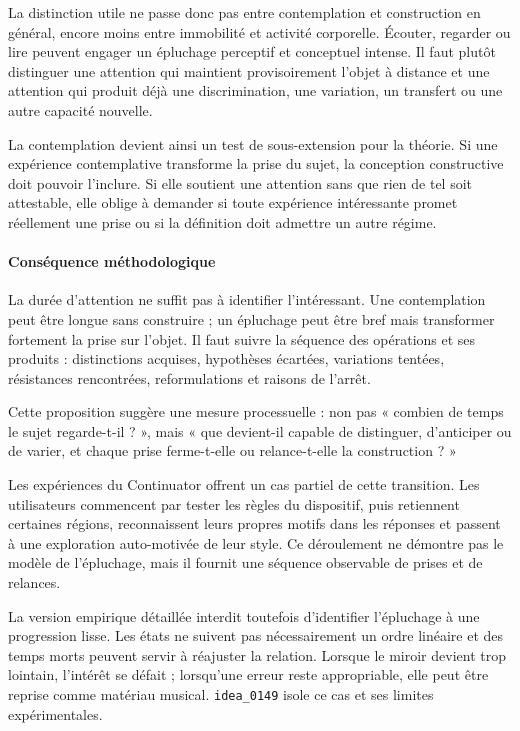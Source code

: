 \documentclass[10pt,a4paper]{article}
\begin{document}
La distinction utile ne passe donc pas entre contemplation et construction en général, encore moins entre immobilité et activité corporelle. Écouter, regarder ou lire peuvent engager un épluchage perceptif et conceptuel intense. Il faut plutôt distinguer une attention qui maintient provisoirement l'objet à distance et une attention qui produit déjà une discrimination, une variation, un transfert ou une autre capacité nouvelle.

La contemplation devient ainsi un test de sous-extension pour la théorie. Si une expérience contemplative transforme la prise du sujet, la conception constructive doit pouvoir l'inclure. Si elle soutient une attention sans que rien de tel soit attestable, elle oblige à demander si toute expérience intéressante promet réellement une prise ou si la définition doit admettre un autre régime.

\paragraph{Conséquence méthodologique}
La durée d'attention ne suffit pas à identifier l'intéressant. Une contemplation peut être longue sans construire ; un épluchage peut être bref mais transformer fortement la prise sur l'objet. Il faut suivre la séquence des opérations et ses produits : distinctions acquises, hypothèses écartées, variations tentées, résistances rencontrées, reformulations et raisons de l'arrêt.

Cette proposition suggère une mesure processuelle : non pas « combien de temps le sujet regarde-t-il ? », mais « que devient-il capable de distinguer, d'anticiper ou de varier, et chaque prise ferme-t-elle ou relance-t-elle la construction ? »

Les expériences du Continuator offrent un cas partiel de cette transition. Les utilisateurs commencent par tester les règles du dispositif, puis retiennent certaines régions, reconnaissent leurs propres motifs dans les réponses et passent à une exploration auto-motivée de leur style. Ce déroulement ne démontre pas le modèle de l'épluchage, mais il fournit une séquence observable de prises et de relances.

La version empirique détaillée interdit toutefois d'identifier l'épluchage à une progression lisse. Les états ne suivent pas nécessairement un ordre linéaire et des temps morts peuvent servir à réajuster la relation. Lorsque le miroir devient trop lointain, l'intérêt se défait ; lorsqu'une erreur reste appropriable, elle peut être reprise comme matériau musical. \texttt{idea\_0149} isole ce cas et ses limites expérimentales.
\end{document}
